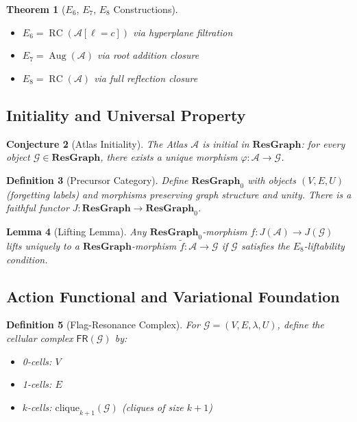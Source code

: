 \documentclass[12pt]{article}
\newtheorem{theorem}{Theorem}
\newtheorem{lemma}[theorem]{Lemma}
\newtheorem{definition}[theorem]{Definition}
\newtheorem{conjecture}[theorem]{Conjecture}
\newcommand{\A}{\mathcal{A}}
\newcommand{\G}{\mathcal{G}}
\newcommand{\ResGraph}{\mathbf{ResGraph}}
\newcommand{\ResGraphZero}{\mathbf{ResGraph}_0}
\newcommand{\clique}{\text{clique}}
\begin{document}
\begin{theorem}[$E_6$, $E_7$, $E_8$ Constructions]
\begin{itemize}
\item $E_6 = \operatorname{RC}(\A[\ell = c])$ via hyperplane filtration
\item $E_7 = \operatorname{Aug}(\A)$ via root addition closure  
\item $E_8 = \operatorname{RC}(\A)$ via full reflection closure
\end{itemize}
\end{theorem}

\subsection{Initiality and Universal Property}

\begin{conjecture}[Atlas Initiality]
The Atlas $\A$ is initial in $\ResGraph$: for every object $\G \in \ResGraph$, there exists a unique morphism $\varphi: \A \to \G$.
\end{conjecture}

\begin{definition}[Precursor Category]
Define $\ResGraphZero$ with objects $(V,E,U)$ (forgetting labels) and morphisms preserving graph structure and unity. There is a faithful functor $J: \ResGraph \to \ResGraphZero$.
\end{definition}

\begin{lemma}[Lifting Lemma]
Any $\ResGraphZero$-morphism $f: J(\A) \to J(\G)$ lifts uniquely to a $\ResGraph$-morphism $\tilde{f}: \A \to \G$ if $\G$ satisfies the $E_8$-liftability condition.
\end{lemma}

\subsection{Action Functional and Variational Foundation}

\begin{definition}[Flag-Resonance Complex]
For $\G = (V,E,\lambda,U)$, define the cellular complex $\mathsf{FR}(\G)$ by:
\begin{itemize}
\item 0-cells: $V$
\item 1-cells: $E$  
\item $k$-cells: $\clique_{k+1}(\G)$ (cliques of size $k+1$)
\end{itemize}
\end{definition}
\end{document}
